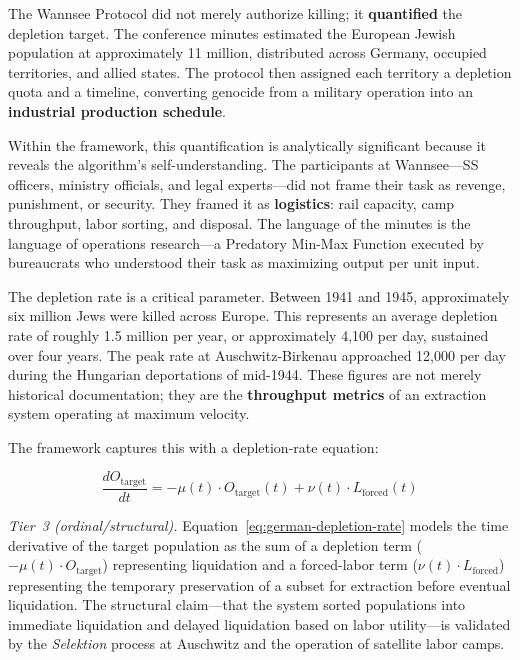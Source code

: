 The Wannsee Protocol did not merely authorize killing; it \textbf{quantified} the depletion target. The conference minutes estimated the European Jewish population at approximately 11 million, distributed across Germany, occupied territories, and allied states. The protocol then assigned each territory a depletion quota and a timeline, converting genocide from a military operation into an \textbf{industrial production schedule}.

Within the framework, this quantification is analytically significant because it reveals the algorithm's self-understanding. The participants at Wannsee---SS officers, ministry officials, and legal experts---did not frame their task as revenge, punishment, or security. They framed it as \textbf{logistics}: rail capacity, camp throughput, labor sorting, and disposal. The language of the minutes is the language of operations research---a Predatory Min-Max Function executed by bureaucrats who understood their task as maximizing output per unit input.

The depletion rate is a critical parameter. Between 1941 and 1945, approximately six million Jews were killed across Europe. This represents an average depletion rate of roughly 1.5 million per year, or approximately 4,100 per day, sustained over four years. The peak rate at Auschwitz-Birkenau approached 12,000 per day during the Hungarian deportations of mid-1944. These figures are not merely historical documentation; they are the \textbf{throughput metrics} of an extraction system operating at maximum velocity.

The framework captures this with a depletion-rate equation:

\begin{equation}\label{eq:german-depletion-rate}
\frac{dO_{\text{target}}}{dt} = -\mu(t) \cdot O_{\text{target}}(t) + \nu(t) \cdot L_{\text{forced}}(t)
\end{equation}

\noindent\textit{Tier~3 (ordinal/structural).} Equation~\ref{eq:german-depletion-rate} models the time derivative of the target population as the sum of a depletion term ($-\mu(t) \cdot O_{\text{target}}$) representing liquidation and a forced-labor term ($\nu(t) \cdot L_{\text{forced}}$) representing the temporary preservation of a subset for extraction before eventual liquidation. The structural claim---that the system sorted populations into immediate liquidation and delayed liquidation based on labor utility---is validated by the \textit{Selektion} process at Auschwitz and the operation of satellite labor camps.

